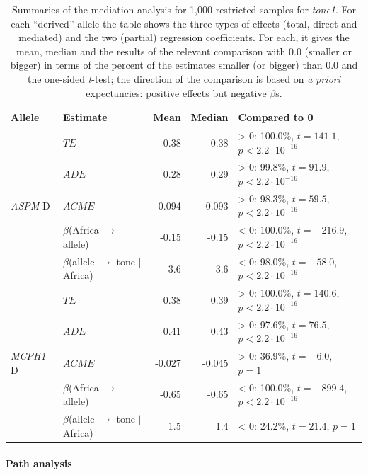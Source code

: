 \documentclass[twoside,onecolumn]{article}
\begin{document}
\begin{table}[h]
  \caption{Summaries of the mediation analysis for 1,000 restricted samples for \textit{tone1}. For each ``derived'' allele the table shows the three types of effects (total, direct and mediated) and the two (partial) regression coefficients. For each, it gives the mean, median and the results of the relevant comparison with 0.0 (smaller or bigger) in terms of the percent of the estimates smaller (or bigger) than 0.0 and the one-sided \textit{t}-test; the direction of the comparison is based on \textit{a priori} expectancies: positive effects but negative $\beta$s.}
  \label{Tab:tone1_mediation_restricted}
  \centering
  \begin{tabular}{|l|l|r|r|l|}
    \toprule
    \textbf{Allele} & \textbf{Estimate} & \textbf{Mean} & \textbf{Median} & \textbf{Compared to 0} \\
    \midrule
    \multirow{5}{*}{\textit{ASPM}-D} & $TE$ & 0.38 & 0.38 & > 0: 100.0\%, $t = 141.1$, $p < 2.2\cdot10^{-16}$ \\
      & $ADE$ & 0.28 & 0.29 & > 0: 99.8\%, $t = 91.9$, $p < 2.2\cdot10^{-16}$ \\
      & $ACME$ & 0.094 & 0.093 & > 0: 98.3\%, $t = 59.5$, $p < 2.2\cdot10^{-16}$ \\
      & $\beta$(Africa $\rightarrow$ allele) & -0.15 & -0.15 & < 0: 100.0\%, $t = -216.9$, $p < 2.2\cdot10^{-16}$ \\
      & $\beta$(allele $\rightarrow$ tone $\mid$ Africa) & -3.6 & -3.6 & < 0: 98.0\%, $t = -58.0$, $p < 2.2\cdot10^{-16}$ \\
    \midrule
    \multirow{5}{*}{\textit{MCPH1}-D} & $TE$ & 0.38 & 0.39 & > 0: 100.0\%, $t = 140.6$, $p < 2.2\cdot10^{-16}$ \\
      & $ADE$ & 0.41 & 0.43 & > 0: 97.6\%, $t = 76.5$, $p < 2.2\cdot10^{-16}$ \\
      & $ACME$ & -0.027 & -0.045 & > 0: 36.9\%, $t = -6.0$, $p = 1$ \\
      & $\beta$(Africa $\rightarrow$ allele) & -0.65 & -0.65 & < 0: 100.0\%, $t = -899.4$, $p < 2.2\cdot10^{-16}$ \\
      & $\beta$(allele $\rightarrow$ tone $\mid$ Africa) & 1.5 & 1.4 & < 0: 24.2\%, $t = 21.4$, $p = 1$ \\
    \bottomrule
  \end{tabular}
\end{table}


\paragraph{Path analysis}
\end{document}
